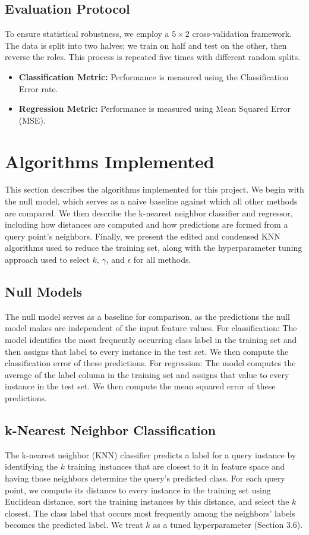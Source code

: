 \documentclass[twoside,11pt]{article}
\begin{document}
\subsection{Evaluation Protocol}
To ensure statistical robustness, we employ a $5 \times 2$ cross-validation framework. The data is split into two halves; we train on half and test on the other, then reverse the roles. This process is repeated five times with different random splits.
\begin{itemize}
    \item \textbf{Classification Metric:} Performance is measured using the Classification Error rate.
    \item \textbf{Regression Metric:} Performance is measured using Mean Squared Error (MSE).
\end{itemize}

\section{Algorithms Implemented}
This section describes the algorithms implemented for this project. We begin with the null model, which serves as a naive baseline against which all other methods are compared. We then describe the k-nearest neighbor classifier and regressor, including how distances are computed and how predictions are formed from a query point's neighbors. Finally, we present the edited and condensed KNN algorithms used to reduce the training set, along with the hyperparameter tuning approach used to select $k$, $\gamma$, and $\epsilon$ for all methods.


\subsection{Null Models}
The null model serves as a baseline for comparison, as the predictions the null model makes are independent of the input feature values. For classification: The model identifies the most frequently occurring class label in the training set and then assigns that label to every instance in the test set. We then compute the classification error of these predictions. For regression: The model computes the average of the label column in the training set and assigns that value to every instance in the test set. We then compute the mean squared error of these predictions.

\subsection{k-Nearest Neighbor Classification}
The k-nearest neighbor (KNN) classifier predicts a label for a query instance by identifying the $k$ training instances that are closest to it in feature space and having those neighbors determine the query's predicted class. For each query point, we compute its distance to every instance in the training set using Euclidean distance, sort the training instances by this distance, and select the $k$ closest. The class label that occurs most frequently among the neighbors' labels becomes the predicted label. We treat $k$ as a tuned hyperparameter (Section 3.6).
\end{document}
